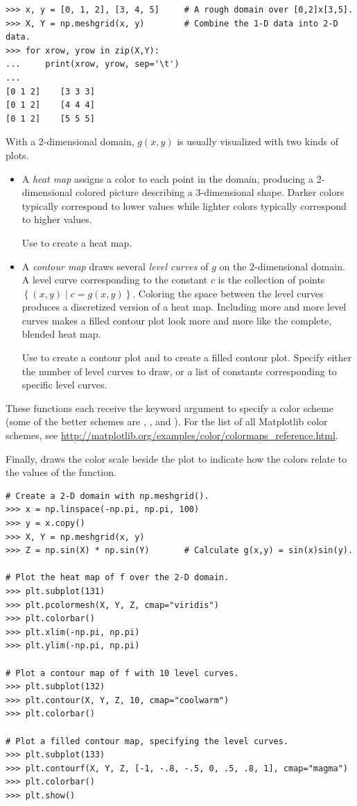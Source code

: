 \begin{lstlisting}
>>> x, y = [0, 1, 2], [3, 4, 5]     # A rough domain over [0,2]x[3,5].
>>> X, Y = np.meshgrid(x, y)        # Combine the 1-D data into 2-D data.
>>> for xrow, yrow in zip(X,Y):
...     print(xrow, yrow, sep='\t')
...
[0 1 2]    [3 3 3]
[0 1 2]    [4 4 4]
[0 1 2]    [5 5 5]
\end{lstlisting}

With a 2-dimensional domain, $g(x,y)$ is usually visualized with two kinds of plots.

\begin{itemize}
\item A \emph{heat map} assigns a color to each point in the domain, producing a 2-dimensional colored picture describing a 3-dimensional shape.
Darker colors typically correspond to lower values while lighter colors typically correspond to higher values.

Use  to create a heat map.

\item A \emph{contour map} draws several \emph{level curves} of $g$ on the $2$-dimensional domain.
A level curve corresponding to the constant $c$ is the collection of points $\left\{(x,y)\mid c = g(x,y)\right\}$.
Coloring the space between the level curves produces a discretized version of a heat map.
Including more and more level curves makes a filled contour plot look more and more like the complete, blended heat map.

Use  to create a contour plot and  to create a filled contour plot.
Specify either the number of level curves to draw, or a list of constants corresponding to specific level curves.
\end{itemize}

These functions each receive the keyword argument  to specify a color scheme (some of the better schemes are , , and ).
For the list of all Matplotlib color schemes, see \url{http://matplotlib.org/examples/color/colormaps_reference.html}.

Finally,  draws the color scale beside the plot to indicate how the colors relate to the values of the function.

\begin{lstlisting}
# Create a 2-D domain with np.meshgrid().
>>> x = np.linspace(-np.pi, np.pi, 100)
>>> y = x.copy()
>>> X, Y = np.meshgrid(x, y)
>>> Z = np.sin(X) * np.sin(Y)       # Calculate g(x,y) = sin(x)sin(y).

# Plot the heat map of f over the 2-D domain.
>>> plt.subplot(131)
>>> plt.pcolormesh(X, Y, Z, cmap="viridis")
>>> plt.colorbar()
>>> plt.xlim(-np.pi, np.pi)
>>> plt.ylim(-np.pi, np.pi)

# Plot a contour map of f with 10 level curves.
>>> plt.subplot(132)
>>> plt.contour(X, Y, Z, 10, cmap="coolwarm")
>>> plt.colorbar()

# Plot a filled contour map, specifying the level curves.
>>> plt.subplot(133)
>>> plt.contourf(X, Y, Z, [-1, -.8, -.5, 0, .5, .8, 1], cmap="magma")
>>> plt.colorbar()
>>> plt.show()
\end{lstlisting}


